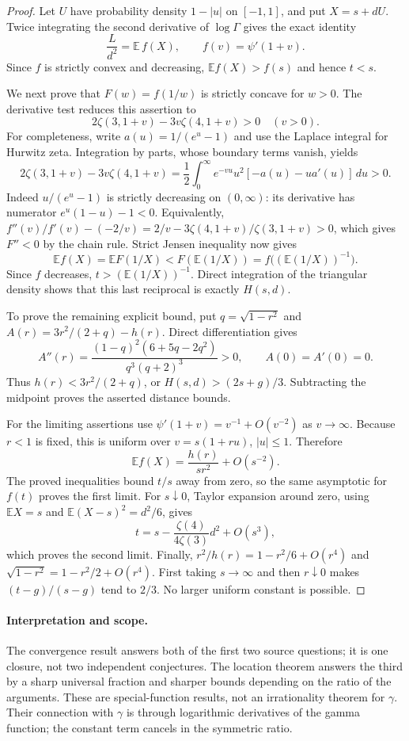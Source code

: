 \documentclass[11pt,a4paper]{article}
\theoremstyle{definition}
\theoremstyle{remark}
\numberwithin{equation}{section}
\begin{document}
\begin{proof}
Let $U$ have probability density $1-|u|$ on $[-1,1]$, and put
$X=s+dU$. Twice integrating the second derivative of $\log\Gamma$
gives the exact identity
\[
 \frac{L}{d^2}=\mathbb E\, f(X),\qquad f(v)=\psi'(1+v).
\]
Since $f$ is strictly convex and decreasing,
$\mathbb E f(X)>f(s)$ and hence $t<s$.

We next prove that $F(w)=f(1/w)$ is strictly concave for $w>0$.
The derivative test reduces this assertion to
\[
 2\zeta(3,1+v)-3v\zeta(4,1+v)>0\quad(v>0).
\]
For completeness, write $a(u)=1/(e^u-1)$ and use the Laplace
integral for Hurwitz zeta. Integration by parts, whose boundary
terms vanish, yields
\[
 2\zeta(3,1+v)-3v\zeta(4,1+v)
 =\frac12\int_0^\infty e^{-vu}u^2[-a(u)-u a'(u)]\,du>0.
\]
Indeed $u/(e^u-1)$ is strictly decreasing on $(0,\infty)$:
its derivative has numerator $e^u(1-u)-1<0$.
Equivalently,
$f''(v)/f'(v)-(-2/v)=2/v-3\zeta(4,1+v)/\zeta(3,1+v)>0$,
which gives $F''<0$ by the chain rule.
Strict Jensen inequality now gives
\[
 \mathbb E f(X)=\mathbb E F(1/X)
 <F(\mathbb E(1/X))
 = f\bigl((\mathbb E(1/X))^{-1}\bigr).
\]
Since $f$ decreases, $t>(\mathbb E(1/X))^{-1}$.
Direct integration of the triangular density shows that this
last reciprocal is exactly $H(s,d)$.

To prove the remaining explicit bound, put $q=\sqrt{1-r^2}$ and
$A(r)=3r^2/(2+q)-h(r)$. Direct differentiation gives
\[
 A''(r)=\frac{(1-q)^2(6+5q-2q^2)}{q^3(q+2)^3}>0,
 \qquad A(0)=A'(0)=0.
\]
Thus $h(r)<3r^2/(2+q)$, or $H(s,d)>(2s+g)/3$.
Subtracting the midpoint proves the asserted distance bounds.

For the limiting assertions use
$\psi'(1+v)=v^{-1}+O(v^{-2})$ as $v\to\infty$.
Because $r<1$ is fixed, this is uniform over
$v=s(1+ru)$, $|u|\le1$. Therefore
\[
 \mathbb E f(X)=\frac{h(r)}{s r^2}+O(s^{-2}).
\]
The proved inequalities bound $t/s$ away from zero, so the same
asymptotic for $f(t)$ proves the first limit. For $s\downarrow0$,
Taylor expansion around zero, using $\mathbb E X=s$ and
$\mathbb E(X-s)^2=d^2/6$, gives
\[
 t=s-\frac{\zeta(4)}{4\zeta(3)}d^2+O(s^3),
\]
which proves the second limit. Finally,
$r^2/h(r)=1-r^2/6+O(r^4)$ and
$\sqrt{1-r^2}=1-r^2/2+O(r^4)$. First taking $s\to\infty$
and then $r\downarrow0$ makes $(t-g)/(s-g)$ tend to $2/3$.
No larger uniform constant is possible.
\end{proof}

\paragraph{Interpretation and scope.}
The convergence result answers both of the first two source questions;
it is one closure, not two independent conjectures. The location theorem
answers the third by a sharp universal fraction and sharper bounds
depending on the ratio of the arguments. These are special-function
results, not an irrationality theorem for $\gamma$. Their connection
with $\gamma$ is through logarithmic derivatives of the gamma function;
the constant term cancels in the symmetric ratio.
\end{document}
